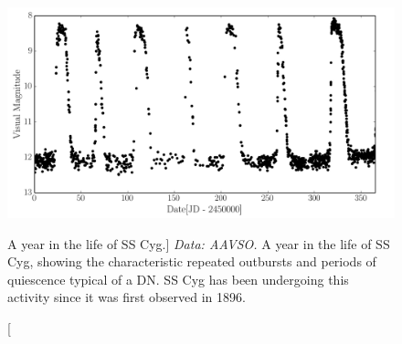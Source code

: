 \begin{figure}
\centering
\includegraphics[width=1.0\textwidth]{figures/01-intro/lc_sscyg.png}
\caption
[A year in the life of SS Cyg.]
{
{\sl Data: AAVSO.} 
A year in the life of SS Cyg, showing the characteristic repeated
outbursts and periods of quiescence typical of a DN. SS Cyg has been
undergoing this activity since it was first observed in 1896.
} 
\label{fig:sscyg}
\end{figure}

